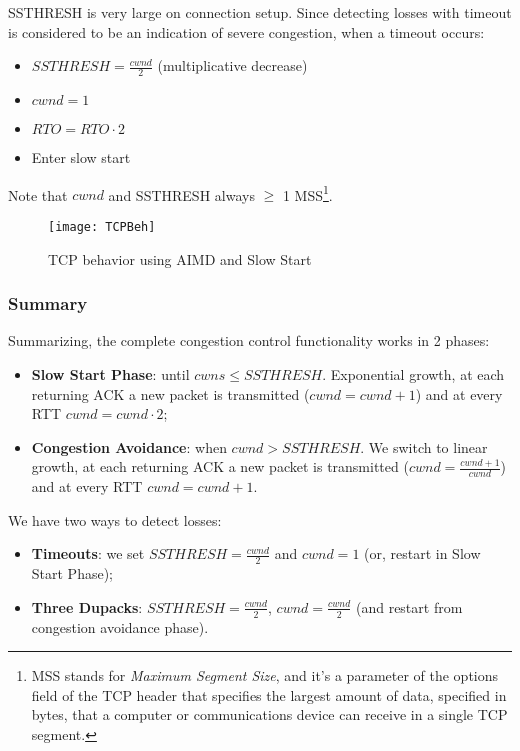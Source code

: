 SSTHRESH is very large on connection setup.
Since detecting losses with timeout is considered to be an indication 
of severe congestion, when a timeout occurs:	
\begin{itemize}
  \item $SSTHRESH = \frac{cwnd}{2}$ (multiplicative decrease)
  \item $cwnd=1$
  \item $RTO=RTO \cdot 2$
  \item Enter slow start
\end{itemize}

Note that $cwnd$ and SSTHRESH always $\ge$ 1 MSS\footnote{
MSS stands for \textit{Maximum Segment Size}, and it's a parameter of the
options field of the TCP header that specifies the largest amount of data,
specified in bytes, that a computer or communications device can receive in a
single TCP segment.
}. 

\begin{figure}[t]
  \centering
  \texttt{[image: TCPBeh]}
  \caption{TCP behavior using AIMD and Slow Start}			
  \label{fig:tcp:TCPBeh}
\end{figure}

\subsubsection{Summary}	
	Summarizing, the complete congestion control functionality works in 2 
phases:
\begin{itemize}
  \item \textbf{Slow Start Phase}: until $cwns \le SSTHRESH$.
Exponential growth, at each returning ACK a new packet is transmitted 
($cwnd=cwnd+1$) and at every RTT $cwnd=cwnd \cdot 2$; 
  \item \textbf{Congestion Avoidance}: when $cwnd > SSTHRESH$. We 
switch to linear growth, at each returning ACK a new packet is transmitted 
($cwnd=\frac{cwnd+1}{cwnd}$) and at every RTT $cwnd=cwnd+1$.
\end{itemize}
	
We have two ways to detect losses: 
\begin{itemize}
  \item \textbf{Timeouts}: we set $SSTHRESH=\frac{cwnd}{2}$ and $cwnd=1$
(or, restart in Slow Start Phase);
  \item \textbf{Three Dupacks}: $SSTHRESH=\frac{cwnd}{2}$, $cwnd=\frac{cwnd}{2}$
(and restart from congestion avoidance phase).		 
\end{itemize}
	
